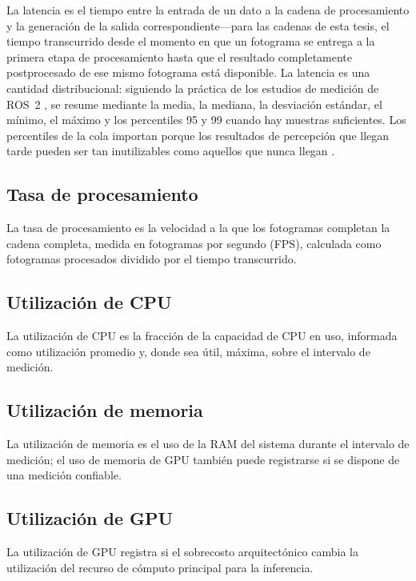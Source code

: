 La latencia es el tiempo entre la entrada de un dato a la cadena de
procesamiento y la generación de la salida correspondiente---para las
cadenas de esta tesis, el tiempo transcurrido desde el momento en que un
fotograma se entrega a la primera etapa de procesamiento hasta que el
resultado completamente postprocesado de ese mismo fotograma está
disponible. La latencia es una cantidad distribucional: siguiendo la
práctica de los estudios de medición de ROS~2 \cite{kronauer2021,
macenski2022}, se resume mediante la media, la mediana, la desviación
estándar, el mínimo, el máximo y los percentiles 95 y 99 cuando hay muestras
suficientes. Los percentiles de la cola importan porque los resultados de
percepción que llegan tarde pueden ser tan inutilizables como aquellos que
nunca llegan \cite{betz2023a}.

\subsection{Tasa de procesamiento}

La tasa de procesamiento es la velocidad a la que los fotogramas completan
la cadena completa, medida en fotogramas por segundo (FPS), calculada como
fotogramas procesados dividido por el tiempo transcurrido.

\subsection{Utilización de CPU}

La utilización de CPU es la fracción de la capacidad de CPU en uso,
informada como utilización promedio y, donde sea útil, máxima, sobre el
intervalo de medición.

\subsection{Utilización de memoria}

La utilización de memoria es el uso de la RAM del sistema durante el
intervalo de medición; el uso de memoria de GPU también puede registrarse si
se dispone de una medición confiable.

\subsection{Utilización de GPU}

La utilización de GPU registra si el sobrecosto arquitectónico cambia la
utilización del recurso de cómputo principal para la inferencia.

